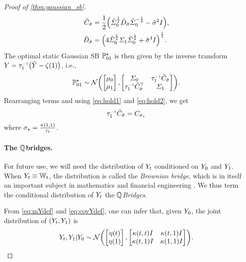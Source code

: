 \begin{proof}[Proof of \cref{thm:gaussian_sb}]
\begin{align}
\label{eq:hold1}
\tilde{C}_{\tilde{\sdev}} &=  \frac{1}{2}\parens*{\tcovar^{\frac{1}{2}} \tilde{D}_{\tilde{\sdev}} \tcovar^{-\frac{1}{2}} - \tilde{\sdev}^2\eye}, \\
\label{eq:hold2}
\tilde{D}_{\tilde{\sdev}} &= \parens*{ 4\tcovar^{\frac{1}{2}} \covaralt \tcovar^{\frac{1}{2}} +  \tilde{\sdev}^4\eye  }^{\frac{1}{2}}.
\end{align}
The optimal static Gaussian \acrshort{SB} $\Pstasol$ is then given by the inverse transform $Y = \aggtimeinv[\horizon] \parens*{\tilde{Y} - \tshift[\horizon]}$, i.e.,
\begin{align}
\label{eq:Pstasol}
\Pstasol \sim \Ncal \parens*{  \begin{bmatrix}
\m \\
\malt
\end{bmatrix},  \begin{bmatrix}
\covar &  \aggtimeinv[\horizon] \tilde{C}_{\tilde{\sdev}    } \\
\aggtimeinv[\horizon]\tilde{C}_{ \tilde{\sdev}}^\top & \covaralt
\end{bmatrix}}.
\end{align}Rearranging terms and using \eqref{eq:hold1} and \eqref{eq:hold2}, we get 
\begin{align}
\aggtimeinv[\horizon] \tilde{C}_{\tilde{\sdev}} = C_{\sdev_\star}
\end{align}where $\sdev_\star = \frac{\kernel[\horizon][\horizon]}{ \aggtime[\horizon] }$.


\paragraph{The $\refprobase$\textendash bridges.}

For future use, we will need the distribution of $\refsde$ conditioned on $\refsde[0]$ and $\refsde[\horizon]$. When $\refsde \equiv \Wiener$, the distribution is called the \emph{Brownian bridge}, which is in itself an important subject in mathematics and financial engineering \citep{mansuy2008aspects}. We thus term the conditional distribution of $\refsde$ the \emph{$\refprobase$\textendash Bridges}.

From \eqref{eq:mYdef} and \eqref{eq:covYdef}, one can infer that, given $\refsde[0]$, the joint distribution of $\parens*{\refsde,\refsde[\horizon]}$ is 
\begin{align}
\refsde,\refsde[\horizon] \vert \refsde[0] \sim  \Ncal \parens*{  \begin{bmatrix}
\mYcinit[\ctime] \\
\mYcinit[\horizon]
\end{bmatrix},  \begin{bmatrix}
\kernel[\ctime][\ctime] \eye &  \kernel[\ctime][\horizon]\eye \\
\kernel[\ctime][\horizon]\eye & \kernel[\horizon][\horizon]\eye
\end{bmatrix} }.
\end{align}


\end{proof}
